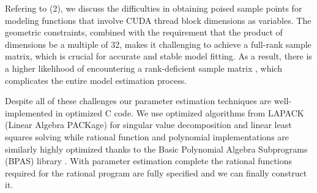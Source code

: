 Refering to (2), we discuss the difficulties in obtaining poised sample points for 
modeling functions that involve CUDA thread block dimensions as variables.
The geometric constraints, combined with the requirement that the product of dimensions be a multiple of 32, 
makes it challenging to achieve a full-rank sample matrix, which is crucial for accurate and stable model 
fitting. As a result, there is a higher likelihood of encountering 
a rank-deficient sample matrix \cite{chung1977lattices, olver2006multivariate}, which complicates the entire model estimation process.



%
%

Despite all of these challenges our parameter estimation techniques are well-implemented
in optimized C code. We use optimized algorithms from LAPACK (Linear Algebra PACKage) \cite{userguide:lapack}
for singular value decomposition and linear least squares solving
while rational function and polynomial implementations are similarly highly optimized
thanks to the Basic Polynomial Algebra Subprograms (BPAS) library \cite{bpasweb, brandt2018high}.
With parameter estimation complete the rational functions
required for the rational program are fully specified
and we can finally construct it.